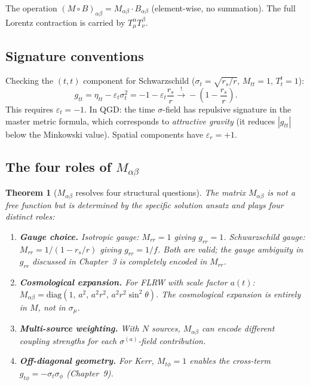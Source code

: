 \documentclass[11pt,a4paper]{article}
\theoremstyle{plain}
\newtheorem{theorem}{Theorem}[section]
\theoremstyle{definition}
\theoremstyle{remark}
\newcommand{\sigt}{\sigma_t}
\begin{document}
The operation $(M\circ B)_{\alpha\beta} = M_{\alpha\beta}\cdot B_{\alpha\beta}$
(element-wise, no summation).  The full Lorentz contraction is carried by
$T^\alpha_\mu T^\beta_\nu$.

\subsection{Signature conventions}

Checking the $(t,t)$ component for Schwarzschild
($\sigt=\sqrt{r_s/r}$, $M_{tt}=1$, $T^t_t=1$):
\begin{equation}
  g_{tt} = \eta_{tt}-\varepsilon_t\sigt^2 = -1-\varepsilon_t\frac{r_s}{r}
  \xrightarrow{!} -\!\left(1-\frac{r_s}{r}\right).
  \label{eq:gtt}
\end{equation}
This requires $\varepsilon_t = -1$.  In QGD: the time $\sigma$-field has
repulsive signature in the master metric formula, which corresponds to
\emph{attractive gravity} (it reduces $|g_{tt}|$ below the Minkowski value).
Spatial components have $\varepsilon_r=+1$.

\subsection{The four roles of $M_{\alpha\beta}$}

\begin{theorem}[$M_{\alpha\beta}$ resolves four structural questions]
\label{thm:M_roles}
The matrix $M_{\alpha\beta}$ is not a free function but is determined by
the specific solution ansatz and plays four distinct roles:

\begin{enumerate}[noitemsep]
  \item \textbf{Gauge choice.}
    Isotropic gauge: $M_{rr}=1$ giving $g_{rr}=1$.
    Schwarzschild gauge: $M_{rr}=1/(1-r_s/r)$ giving $g_{rr}=1/f$.
    Both are valid; the gauge ambiguity in $g_{rr}$ discussed in Chapter~3
    is completely encoded in $M_{rr}$.

  \item \textbf{Cosmological expansion.}
    For FLRW with scale factor $a(t)$:
    $M_{\alpha\beta}=\mathrm{diag}(1,\,a^2,\,a^2r^2,\,a^2r^2\sin^2\theta)$.
    The cosmological expansion is entirely in $M$, not in $\sigma_\mu$.

  \item \textbf{Multi-source weighting.}
    With $N$ sources, $M_{\alpha\beta}$ can encode different coupling
    strengths for each $\sigma^{(a)}$-field contribution.

  \item \textbf{Off-diagonal geometry.}
    For Kerr, $M_{t\phi}=1$ enables the cross-term
    $g_{t\phi}=-\sigma_t\sigma_\phi$ (Chapter~9).
\end{enumerate}
\end{theorem}
\end{document}
